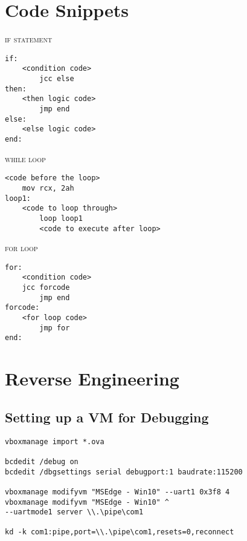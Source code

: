 \documentclass[a4paper,12pt]{article}
\begin{document}
\newpage
\section{Code Snippets}
\lstset{language=[x86masm]Assembler}
\textsc{if statement}
\begin{lstlisting}[frame=single]
if:
	<condition code>
        jcc	else
then:
	<then logic code>
        jmp	end
else:
	<else logic code>
end:
\end{lstlisting}
\textsc{while loop}
\begin{lstlisting}[frame=single]
	<code before the loop>
	mov rcx, 2ah
loop1:
	<code to loop through>
        loop loop1
        <code to execute after loop>
\end{lstlisting}
\textsc{for loop}
\begin{lstlisting}[frame=single]
for:
	<condition code>
	jcc forcode
        jmp end
forcode:
	<for loop code>
        jmp for
end:
\end{lstlisting}

\newpage
\section{Reverse Engineering}
\subsection{Setting up a VM for Debugging}

\begin{lstlisting}[frame=single]
vboxmanage import *.ova

bcdedit /debug on
bcdedit /dbgsettings serial debugport:1 baudrate:115200

vboxmanage modifyvm "MSEdge - Win10" --uart1 0x3f8 4
vboxmanage modifyvm "MSEdge - Win10" ^ 
--uartmode1 server \\.\pipe\com1

kd -k com1:pipe,port=\\.\pipe\com1,resets=0,reconnect

\end{lstlisting}


\newpage
{}
\tableofcontents
{}
\end{document}
